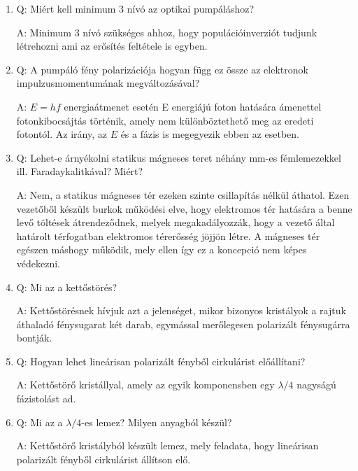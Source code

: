 \begin{enumerate}
    \item Q: Miért kell minimum 3 nívó az optikai pumpáláshoz?
    \begin{displayquote}
    	A: Minimum $3$ nívó szükséges ahhoz, hogy populációinverziót tudjunk létrehozni ami az erősítés feltétele is egyben.
    \end{displayquote}
    
    \item Q: A pumpáló fény polarizációja hogyan függ ez össze az elektronok impulzusmomentumának megváltozásával?
    \begin{displayquote}
    	A: $E = hf$ energiaátmenet esetén E energiájú foton hatására ámenettel fotonkibocsájtás történik, amely nem különböztethető meg az eredeti fotontól. Az irány, az $E$ és a fázis is megegyezik ebben az esetben.
    \end{displayquote}
    
    \item Q: Lehet-e árnyékolni statikus mágneses teret néhány mm-es fémlemezekkel ill. Faradaykalitkával? Miért?
    \begin{displayquote}
    	A: Nem, a statikus mágneses tér ezeken szinte csillapítás nélkül áthatol. Ezen vezetőből készült burkok működési elve, hogy elektromos tér hatására a benne levő töltések átrendeződnek, melyek megakadályozzák, hogy a vezető által határolt térfogatban elektromos térerősség jöjjön létre. A mágneses tér egészen máshogy működik, mely ellen így ez a koncepció nem képes védekezni.
    \end{displayquote}
    
    \item Q: Mi az a kettőstörés?
    \begin{displayquote}
    	A: Kettőstörésnek hívjuk azt a jelenséget, mikor bizonyos kristályok a rajtuk áthaladó fénysugarat két darab, egymással merőlegesen polarizált fénysugárra bontják.
    \end{displayquote}
    
    \item Q: Hogyan lehet lineárisan polarizált fényből cirkulárist előállítani?
    \begin{displayquote}
    	A: Kettőstörő kristállyal, amely az egyik komponensben egy $\lambda/4$ nagyságú fázistolást ad.
    \end{displayquote}
    
    \item Q: Mi az a $\lambda/4$-es lemez? Milyen anyagból készül? 
    \begin{displayquote}
    	A: Kettőstörő kristályból készült lemez, mely feladata, hogy lineárisan polarizált fényből cirkulárist állítson elő.
    \end{displayquote}
    

\end{enumerate}
